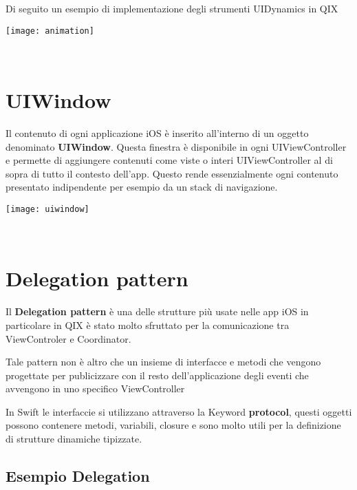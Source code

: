 Di seguito un esempio di implementazione degli strumenti UIDynamics in QIX

\begin{minipage}{\linewidth}
    \centering
    \texttt{[image: animation]}
    \label{fig:6}
\end{minipage}\\

\section{UIWindow}\label{sec:uiwindow}

Il contenuto di ogni applicazione iOS è inserito all'interno di un oggetto denominato
\textbf{UIWindow}\cite{uiwindow}. Questa finestra è disponibile in ogni UIViewController e permette di aggiungere contenuti
come viste o interi UIViewController al di sopra di tutto il contesto dell'app. Questo rende essenzialmente ogni contenuto presentato
indipendente per esempio da un stack di navigazione.

\begin{minipage}{\linewidth}
    \centering
    \texttt{[image: uiwindow]}
    \label{fig:7}
\end{minipage}\\


\section{Delegation pattern}\label{delegation}

Il \textbf{Delegation pattern} è una delle strutture più usate nelle app iOS in particolare in QIX
è stato molto sfruttato per la comunicazione tra ViewControler e Coordinator.

Tale pattern non è altro che un insieme di interfacce e metodi che
vengono progettate per publicizzare con il resto dell'applicazione degli eventi che avvengono in uno specifico ViewController

In Swift le interfaccie si utilizzano attraverso la Keyword \textbf{protocol}, questi oggetti possono contenere metodi, variabili, closure
e sono molto utili per la definizione di strutture dinamiche tipizzate.

\subsection{Esempio Delegation}

